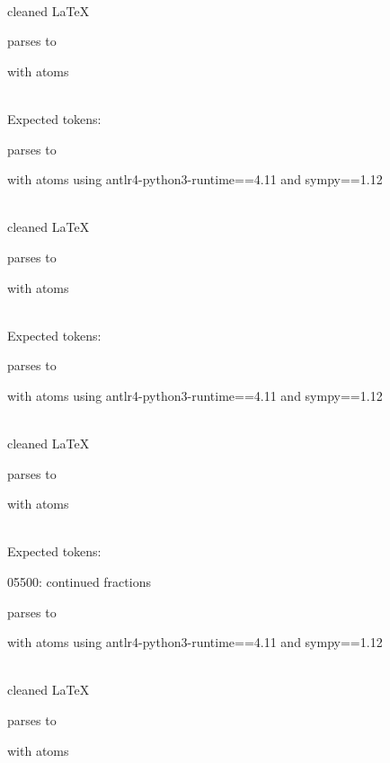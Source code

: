\documentclass{article}
\begin{document}
\ \\
cleaned \LaTeX

parses to

with atoms


\ \\
Expected tokens:


\hrulefill



parses to

with atoms
using antlr4-python3-runtime==4.11 and sympy==1.12

\ \\
cleaned \LaTeX

parses to

with atoms


\ \\
Expected tokens:



\hrulefill



parses to

with atoms
using antlr4-python3-runtime==4.11 and sympy==1.12

\ \\
cleaned \LaTeX

parses to

with atoms


\ \\
Expected tokens:



\hrulefill

05500:
continued fractions
    
parses to

with atoms
using antlr4-python3-runtime==4.11 and sympy==1.12

\ \\
cleaned \LaTeX

parses to

with atoms

\end{document}
